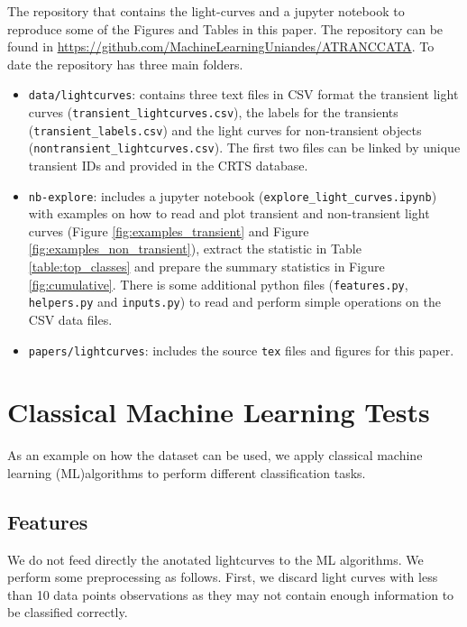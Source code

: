 \documentclass[a4paper,fleqn,usenatbib]{mnras}
\begin{document}
The repository that contains the light-curves and a jupyter notebook
to reproduce some of the Figures and Tables in this paper.
The repository can be found in \url{https://github.com/MachineLearningUniandes/ATRANCCATA}. 
To date the repository has three main folders.
\begin{itemize}

\item \texttt{data/lightcurves}: 
contains three text files in CSV format
the transient light curves (\texttt{transient\_lightcurves.csv}),
the labels for the transients (\texttt{transient\_labels.csv}) and
the light curves for non-transient objects
(\texttt{nontransient\_lightcurves.csv}). 
The first two files can be linked by unique transient IDs and
provided in the CRTS database. 
\item \texttt{nb-explore}: includes a jupyter notebook
  (\texttt{explore\_light\_curves.ipynb}) with examples on how to read
  and plot transient and non-transient light curves (Figure
  \ref{fig:examples_transient} and Figure
  \ref{fig:examples_non_transient}), extract the statistic in Table
  \ref{table:top_classes} and prepare the summary statistics in Figure
  \ref{fig:cumulative}. 
  There is some additional python files (\texttt{features.py},
  \texttt{helpers.py} and \texttt{inputs.py}) to read and perform
  simple operations on the CSV data files. 
\item \texttt{papers/lightcurves}: includes the source \texttt{tex} files and
  figures for this paper. 
\end{itemize}



\section{Classical Machine Learning Tests} 
\label{sec:ml_tests}

As an example on how the dataset can be used, we apply classical
machine learning (ML)algorithms to perform different classification tasks.


\subsection{Features}

We do not feed directly the anotated lightcurves to the ML algorithms.
We perform some preprocessing as follows.
First, we discard light curves with less than 10 data points
observations as they may not contain enough information to be
classified correctly.
\end{document}
